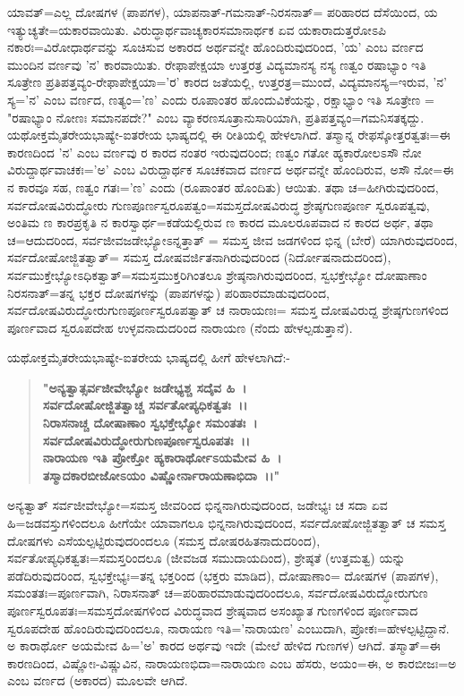 ಯಾವತ್=ಎಲ್ಲ ದೋಷಗಳ (ಪಾಪಗಳ), ಯಾಪ\-ನಾತ್-ಗಮನಾತ್-ನಿರಸನಾತ್= ಪರಿಹಾರದ ದೆಸೆಯಿಂದ, ಯ ಇತ್ಯುಚ್ಯತೇ=ಯಕಾರ\-ವಾಯಿತು. ವಿರುದ್ಧಾರ್ಥವಾಚ್ಯಕಾರಸಮಾನಾರ್ಥಕ ಏವ ಯಕಾರಾದುತ್ತರೋಽಪಿ ನಕಾರಃ=\break ವಿರೋಧಾರ್ಥವನ್ನು ಸೂಚಿಸುವ ಅಕಾರದ ಅರ್ಥವನ್ನೇ ಹೊಂದಿರುವುದರಿಂದ, 'ಯ' ಎಂಬ ವರ್ಣದ ಮುಂದಿನ ವರ್ಣವು 'ನ' ಕಾರವಾಯಿತು. ರೇಫಾಪೇಕ್ಷಯಾ ಉತ್ತರತ್ರ ವಿದ್ಯ\-ಮಾನಸ್ಯ ನಸ್ಯ ಣತ್ವಂ ರಷಾಭ್ಯಾಂ ಇತಿ ಸೂತ್ರೇಣ ಪ್ರತಿಪತ್ತವ್ಯಂ-ರೇಫಾಪೇಕ್ಷಯಾ='ರ' ಕಾರದ ಜತೆಯಲ್ಲಿ, ಉತ್ತರತ್ರ=ಮುಂದೆ, ವಿದ್ಯಮಾನಸ್ಯ=ಇರುವ, 'ನ' ಸ್ಯ='ನ' ಎಂಬ ವರ್ಣದ, ಣತ್ಯಂ='ಣ' ಎಂದು ರೂಪಾಂತರ ಹೊಂದುವಿಕೆಯನ್ನು, ರಕ್ಷಾಭ್ಯಾಂ ಇತಿ ಸೂತ್ರೇಣ = "ರಷಾಭ್ಯಾಂ ನೋಣಃ ಸಮಾನಪದೇ?" ಎಂಬ ವ್ಯಾಕರಣಸೂತ್ರಾನುಸಾರಿಯಾಗಿ, ಪ್ರತಿ\-ಪತ್ತವ್ಯಂ=ಗಮನಿಸತಕ್ಕದ್ದು. ಯಥೋಕ್ತಮೈತರೇಯಭಾಷ್ಯೇ-ಐತರೇಯ ಭಾಷ್ಯದಲ್ಲಿ ಈ ರೀತಿಯಲ್ಲಿ ಹೇಳಲಾಗಿದೆ. ತಸ್ಮಾನ್ನ ರೇಫಸ್ಕೋತ್ತರತ್ವತಃ=ಈ ಕಾರಣದಿಂದ 'ನ' ಎಂಬ ವರ್ಣವು ರ ಕಾರದ ನಂತರ ಇರುವುದರಿಂದ; ಣತ್ವಂ ಗತೋ ಹ್ಯಕಾರೋಲಽಸೌ ನೋ ವಿರುದ್ದಾರ್ಥವಾಚಕಃ='ಅ' ಎಂಬ ವಿರುದ್ದಾರ್ಥಕ ಸೂಚಕವಾದ ವರ್ಣದ ಅರ್ಥವನ್ನೇ ಹೊಂದಿರುವ, ಅಸೌ ನೋ=ಈ ನ ಕಾರವೂ ಸಹ, ಣತ್ವಂ ಗತಃ='ಣ' ಎಂದು (ರೂಪಾಂತರ ಹೊಂದಿತು) ಆಯಿತು. ತಥಾ ಚ=ಹೀಗಿರುವುದರಿಂದ, ಸರ್ವದೋಷವಿರುದ್ಧೋರು ಗುಣ\-ಪೂರ್ಣಸ್ವರೂಪತ್ವಂ=ಸಮಸ್ತದೋಷವಿರುದ್ಧ ಶ್ರೇಷ್ಠಗುಣಪೂರ್ಣ ಸ್ವರೂಪತ್ವವು, ಅಂತಿಮ ಣ ಕಾರಪ್ರಕೃತಿ ನ ಕಾರಸ್ವಾರ್ಥ=ಕಡೆಯಲ್ಲಿರುವ ಣ ಕಾರದ ಮೂಲರೂಪವಾದ ನ ಕಾರದ ಅರ್ಥ, ತಥಾ ಚ=ಆದುದರಿಂದ, ಸರ್ವಜೀವಜಡೇಭ್ಯೋಽನ್ನತ್ತಾತ್ = ಸಮಸ್ತ ಜೀವ ಜಡಗಳಿಂದ ಭಿನ್ನ (ಬೇರೆ) ಯಾಗಿರುವುದರಿಂದ, ಸರ್ವದೋಷೋಜ್ಜಿತತ್ವಾತ್= ಸಮಸ್ತ ದೋಷವರ್ಜಿತನಾಗಿರುವುದರಿಂದ (ನಿರ್ದೋಷನಾದುದರಿಂದ), ಸರ್ವಮುಕ್ತೇಭ್ಯೋಽಧಿಕತ್ವಾತ್=ಸಮಸ್ತಮುಕ್ತರಿಗಿಂತಲೂ ಶ್ರೇಷ್ಠನಾಗಿರುವುದರಿಂದ, ಸ್ವಭಕ್ತೇಭ್ಯೋ ದೋಷಾಣಾಂ ನಿರಸ\-ನಾತ್=ತನ್ನ ಭಕ್ತರ ದೋಷಗಳನ್ನು (ಪಾಪಗಳನ್ನು) ಪರಿಹಾರಮಾಡುವುದರಿಂದ, ಸರ್ವದೋಷವಿರುದ್ಧೋರುಗುಣಪೂರ್ಣಸ್ವರೂಪತ್ವಾತ್ ಚ ನಾರಾಯಣಃ= ಸಮಸ್ತ ದೋಷವಿರುದ್ದ ಶ್ರೇಷ್ಠಗುಣಗಳಿಂದ ಪೂರ್ಣವಾದ ಸ್ವರೂಪದೇಹ ಉಳ್ಳವನಾದುದರಿಂದ ನಾರಾಯಣ (ನೆಂದು ಹೇಳಲ್ಪಡುತ್ತಾನೆ).

ಯಥೋಕ್ತಮೈತರೇಯಭಾಷ್ಯೇ-ಐತರೇಯ ಭಾಷ್ಯದಲ್ಲಿ ಹೀಗೆ ಹೇಳಲಾಗಿದೆ:-

\begin{verse}
\textbf{"ಅನ್ಯತ್ವಾತ್ಸರ್ವಜೀವೇಭ್ಯೋ ಜಡೇಭ್ಯಶ್ಚ ಸದೈವ ಹಿ~।}\\\textbf{ಸರ್ವದೋಷೋಜ್ಜಿತತ್ವಾಚ್ಚ ಸರ್ವತೋಪ್ಯಧಿಕತ್ವತಃ~।।}\\\textbf{ನಿರಾಸನಾಚ್ಚ ದೋಷಾಣಾಂ ಸ್ವಭಕ್ತೇಭ್ಯೋ ಸಮಂತತಃ~।}\\\textbf{ಸರ್ವದೋಷವಿರುದ್ಧೋರುಗುಣಪೂರ್ಣಸ್ವರೂಪತಃ~।।}\\\textbf{ನಾರಾಯಣ ಇತಿ ಪ್ರೋಕ್ತೋ ಹ್ಯಕಾರಾರ್ಥೋಽಯಮೇವ ಹಿ~।}\\\textbf{ತಸ್ಮಾದಕಾರಬೀಜೋಽಯಂ ವಿಷ್ಣೋರ್ನಾರಾಯಣಾಭಿದಾ~।।"}
\end{verse}

ಅನ್ಯತ್ವಾತ್ ಸರ್ವಜೀವೇಭ್ಯೋ=ಸಮಸ್ತ ಜೀವರಿಂದ ಭಿನ್ನನಾಗಿರುವುದರಿಂದ, ಜಡೇಭ್ಯಃ ಚ ಸದಾ ಏವ ಹಿ=ಜಡವಸ್ತುಗಳಿಂದಲೂ ಹೀಗೆಯೇ ಯಾವಾಗಲೂ ಭಿನ್ನನಾಗಿರುವುದರಿಂದ, ಸರ್ವದೋಷೋಜ್ಜಿತತ್ವಾತ್ ಚ ಸಮಸ್ತ ದೋಷಗಳು ಎಸೆಯಲ್ಪಟ್ಟಿರುವುದರಿಂದಲೂ (ಸಮಸ್ತ ದೋಷರಹಿತನಾದುದರಿಂದ), ಸರ್ವತೋಪ್ಯಧಿಕತ್ವತಃ=ಸಮಸ್ತರಿಂದಲೂ (ಜೀವಜಡ ಸಮುದಾಯದಿಂದ), ಶ್ರೇಷ್ಠತೆ (ಉತ್ತಮತ್ವ) ಯನ್ನು ಪಡೆದಿರುವುದರಿಂದ, ಸ್ವಭಕ್ತೇಭ್ಯಃ=ತನ್ನ ಭಕ್ತರಿಂದ (ಭಕ್ತರು ಮಾಡಿದ), ದೋಷಾಣಾಂ= ದೋಷಗಳ (ಪಾಪಗಳ), ಸಮಂತತಃ=ಪೂರ್ಣ\-ವಾಗಿ, ನಿರಾಸನಾತ್ ಚ=ಪರಿಹಾರಮಾಡುವುದರಿಂದಲೂ, ಸರ್ವದೋಷವಿರುದ್ಧೋರುಗುಣ ಪೂರ್ಣಸ್ವರೂಪತಃ=ಸಮಸ್ತದೋಷಗಳಿಂದ ವಿರುದ್ಧವಾದ ಶ್ರೇಷ್ಠವಾದ ಅಸಂಖ್ಯಾತ ಗುಣಗಳಿಂದ ಪೂರ್ಣವಾದ ಸ್ವರೂಪದೇಹ ಹೊಂದಿರುವುದರಿಂದಲೂ, ನಾರಾಯಣ ಇತಿ=\break 'ನಾರಾಯಣ' ಎಂಬುದಾಗಿ, ಪ್ರೋಕಃ=ಹೇಳಲ್ಪಟ್ಟಿದ್ದಾನೆ. ಅ ಕಾರಾರ್ಥೋ ಅಯಮೇವ ಹಿ='ಅ' ಕಾರದ ಅರ್ಥವು ಇದೇ (ಮೇಲೆ ಹೇಳಿದ ಗುಣಗಳ) ಆಗಿದೆ. ತಸ್ಮಾತ್=ಈ ಕಾರಣದಿಂದ, ವಿಷ್ಣೋಃ-ವಿಷ್ಣುವಿನ, ನಾರಾಯಣಭಿದಾ=ನಾರಾಯಣ ಎಂಬ ಹೆಸರು, ಅಯಂ=ಈ, ಅ ಕಾರಬೀಜಃ=ಅ ಎಂಬ ವರ್ಣದ (ಅಕಾರದ) ಮೂಲವೇ ಆಗಿದೆ.

